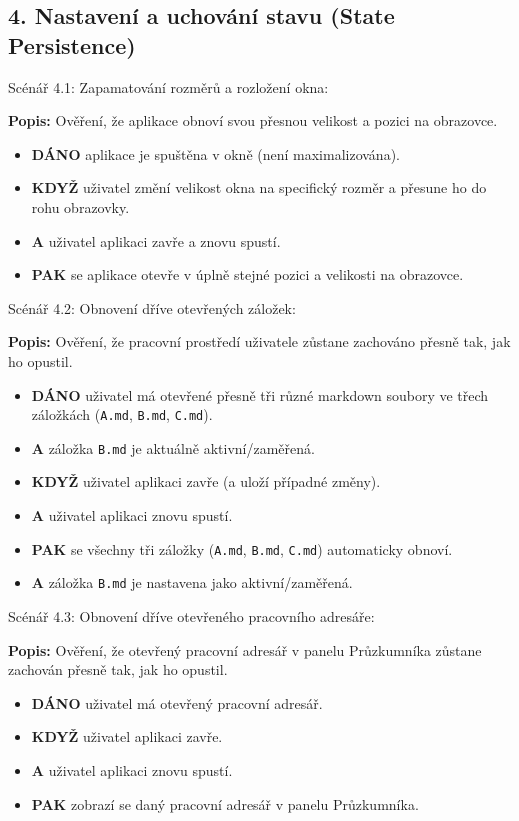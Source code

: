 \documentclass[12pt, a4paper]{article}
\begin{document}
\subsection*{4. Nastavení a uchování stavu (State Persistence)}

Scénář 4.1: Zapamatování rozměrů a rozložení okna:

\textbf{Popis:} Ověření, že aplikace obnoví svou přesnou velikost a pozici na obrazovce.
\begin{itemize}
    \item \textbf{DÁNO} aplikace je spuštěna v okně (není maximalizována).
    \item \textbf{KDYŽ} uživatel změní velikost okna na specifický rozměr a přesune ho do rohu obrazovky.
    \item \textbf{A} uživatel aplikaci zavře a znovu spustí.
    \item \textbf{PAK} se aplikace otevře v úplně stejné pozici a velikosti na obrazovce.
\end{itemize}

Scénář 4.2: Obnovení dříve otevřených záložek:

\textbf{Popis:} Ověření, že pracovní prostředí uživatele zůstane zachováno přesně tak, jak ho opustil.
\begin{itemize}
    \item \textbf{DÁNO} uživatel má otevřené přesně tři různé markdown soubory ve třech záložkách (\texttt{A.md}, \texttt{B.md}, \texttt{C.md}).
    \item \textbf{A} záložka \texttt{B.md} je aktuálně aktivní/zaměřená.
    \item \textbf{KDYŽ} uživatel aplikaci zavře (a uloží případné změny).
    \item \textbf{A} uživatel aplikaci znovu spustí.
    \item \textbf{PAK} se všechny tři záložky (\texttt{A.md}, \texttt{B.md}, \texttt{C.md}) automaticky obnoví.
    \item \textbf{A} záložka \texttt{B.md} je nastavena jako aktivní/zaměřená.
\end{itemize}

Scénář 4.3: Obnovení dříve otevřeného pracovního adresáře:

\textbf{Popis:} Ověření, že otevřený pracovní adresář v panelu Průzkumníka zůstane zachován přesně tak, jak ho opustil.
\begin{itemize}
    \item \textbf{DÁNO} uživatel má otevřený pracovní adresář.
    \item \textbf{KDYŽ} uživatel aplikaci zavře.
    \item \textbf{A} uživatel aplikaci znovu spustí.
    \item \textbf{PAK} zobrazí se daný pracovní adresář v panelu Průzkumníka.
\end{itemize}
\end{document}
